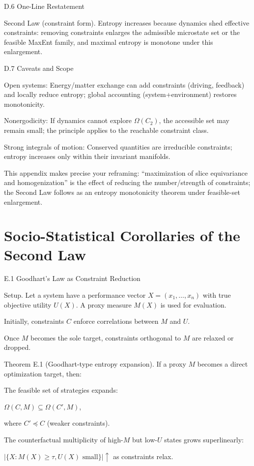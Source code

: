 \documentclass[11pt,a4paper]{article}
\begin{document}
D.6 One-Line Restatement

Second Law (constraint form). Entropy increases because dynamics shed effective constraints: removing constraints enlarges the admissible microstate set or the feasible MaxEnt family, and maximal entropy is monotone under this enlargement.

D.7 Caveats and Scope

Open systems: Energy/matter exchange can add constraints (driving, feedback) and locally reduce entropy; global accounting (system+environment) restores monotonicity.

Nonergodicity: If dynamics cannot explore $\Omega(C_2)$, the accessible set may remain small; the principle applies to the reachable constraint class.

Strong integrals of motion: Conserved quantities are irreducible constraints; entropy increases only within their invariant manifolds.

This appendix makes precise your reframing: “maximization of slice equivariance and homogenization” is the effect of reducing the number/strength of constraints; the Second Law follows as an entropy monotonicity theorem under feasible-set enlargement.

\section{Socio-Statistical Corollaries of the Second Law}
\label{app:e}

E.1 Goodhart’s Law as Constraint Reduction

Setup.
Let a system have a performance vector $X = (x_1, \dots, x_n)$ with true objective utility $U(X)$. A proxy measure $M(X)$ is used for evaluation.

Initially, constraints $C$ enforce correlations between $M$ and $U$.

Once $M$ becomes the sole target, constraints orthogonal to $M$ are relaxed or dropped.

Theorem E.1 (Goodhart-type entropy expansion).
If a proxy $M$ becomes a direct optimization target, then:

The feasible set of strategies expands:

$\Omega(C, M) \subseteq \Omega(C', M)$,

where $C' \preceq C$ (weaker constraints).

The counterfactual multiplicity of high-$M$ but low-$U$ states grows superlinearly:

$|\{X : M(X) \geq \tau, U(X) \text{ small}\}| \uparrow$ as constraints relax.
\end{document}
